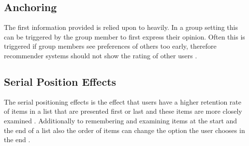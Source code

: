 \subsection{Anchoring}

The first information provided is relied upon to heavily. In a group setting this can be triggered by the group member to first express their opinion. Often this is triggered if group members see preferences of others too early, therefore recommender systems should not show the rating of other users \cite{cosley2003seeing}.

\subsection{Serial Position Effects}

The serial positioning effects is the effect that users have a higher retention rate of items in a list that are presented first or last and these items are more closely examined \cite{felfernigPersuasiveRecommendationSerial2007,murphyPrimacyRecencyEffects2006}. Additionally to remembering and examining items at the start and the end of a list also the order of items can change the option the user chooses in the end \cite{felfernigBiasesGroupDecisions2018}.


